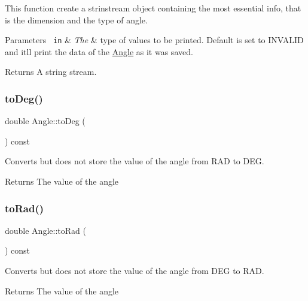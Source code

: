 This function create a strinstream object containing the most essential info, that is the dimension and the type of angle. 
\begin{DoxyParams}[1]{Parameters}
\mbox{\texttt{ in}}  & {\em The} & type of values to be printed. Default is set to I\+N\+V\+A\+L\+ID and it\textquotesingle{}ll print the data of the {\ttfamily \mbox{\hyperlink{class_angle}{Angle}}} as it was saved. \\
\hline
\end{DoxyParams}
\begin{DoxyReturn}{Returns}
A string stream. 
\end{DoxyReturn}
\mbox{\label{class_angle_a89b1e5b7b71fc1bf9565da0bef8f361f}} 
\subsubsection{\texorpdfstring{toDeg()}{toDeg()}}
{\footnotesize\ttfamily double Angle\+::to\+Deg (\begin{DoxyParamCaption}{ }\end{DoxyParamCaption}) const\hspace{0.3cm}{\ttfamily [inline]}}



Converts but does not store the value of the angle from R\+AD to D\+EG. 

\begin{DoxyReturn}{Returns}
The value of the angle 
\end{DoxyReturn}
\mbox{\label{class_angle_ad471cb182722fd7c44cba5aca446ed2c}} 
\subsubsection{\texorpdfstring{toRad()}{toRad()}}
{\footnotesize\ttfamily double Angle\+::to\+Rad (\begin{DoxyParamCaption}{ }\end{DoxyParamCaption}) const\hspace{0.3cm}{\ttfamily [inline]}}



Converts but does not store the value of the angle from D\+EG to R\+AD. 

\begin{DoxyReturn}{Returns}
The value of the angle 
\end{DoxyReturn}


